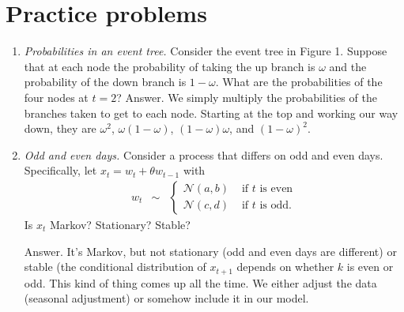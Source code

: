 \documentclass[11pt]{article}
\begin{document}
\section*{Practice problems}

\begin{enumerate}
\item {\it Probabilities in an event tree.\/}
Consider the event tree in Figure 1.  Suppose that at each node
the probability of taking the up branch is $\omega$ and the
probability of the down branch is $1-\omega$.
What are the probabilities of the four nodes at $t=2$?
%
Answer.
We simply multiply the probabilities
of the branches taken to get to each node.
Starting at the top and working our way down,
they are $ \omega^2 $, $ \omega (1-\omega)$, $ (1-\omega)\omega $,
and $(1-\omega)^2$.

\item {\it Odd and even days.\/} 
Consider a process that differs on odd and even days.  
Specifically, let 
$ x_t = w_t + \theta w_{t-1} $ with 
\begin{eqnarray*}
    w_t &\sim& 
            \left\{
            \begin{array}{ll} 
            \mathcal{N}(a,b) & \mbox{ if $t$ is even} \\
            \mathcal{N}(c,d) & \mbox{ if $t$ is odd}  .
            \end{array} 
            \right.
\end{eqnarray*} 
Is $x_t$ Markov?  Stationary?  Stable?  

Answer.  It's Markov, but not stationary (odd and even days are different) 
or stable (the conditional distribution of $x_{t+1}$ depends
on whether $k$ is even or odd.  
This kind of thing comes up all the time.  
We either adjust the data (seasonal adjustment) or somehow 
include it in our model.



\end{enumerate}
\end{document}

